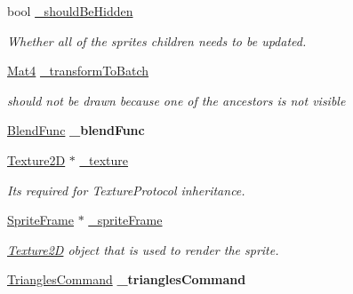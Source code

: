 \begin{DoxyCompactItemize}
bool \hyperlink{classSprite_a0824643df9102b3d72aeffff1d94e8bf}{\+\_\+should\+Be\+Hidden}
\begin{DoxyCompactList}\small\item\em Whether all of the sprite\textquotesingle{}s children needs to be updated. \end{DoxyCompactList}\item 
\mbox{\label{classSprite_aeb5014ea5deb4ec208896a769b4a7b1f}} 
\hyperlink{classMat4}{Mat4} \hyperlink{classSprite_aeb5014ea5deb4ec208896a769b4a7b1f}{\+\_\+transform\+To\+Batch}
\begin{DoxyCompactList}\small\item\em should not be drawn because one of the ancestors is not visible \end{DoxyCompactList}\item 
\mbox{\label{classSprite_aaa257dfceda4e9cf3e124829bb1087be}} 
\hyperlink{structBlendFunc}{Blend\+Func} {\bfseries \+\_\+blend\+Func}
\item 
\mbox{\label{classSprite_a8b0baed963684908bb157dde6d8d2097}} 
\hyperlink{classTexture2D}{Texture2D} $\ast$ \hyperlink{classSprite_a8b0baed963684908bb157dde6d8d2097}{\+\_\+texture}
\begin{DoxyCompactList}\small\item\em It\textquotesingle{}s required for Texture\+Protocol inheritance. \end{DoxyCompactList}\item 
\mbox{\label{classSprite_ac6c32c8ac385e82e6a999fdb9aadad2a}} 
\hyperlink{classSpriteFrame}{Sprite\+Frame} $\ast$ \hyperlink{classSprite_ac6c32c8ac385e82e6a999fdb9aadad2a}{\+\_\+sprite\+Frame}
\begin{DoxyCompactList}\small\item\em \hyperlink{classTexture2D}{Texture2D} object that is used to render the sprite. \end{DoxyCompactList}\item 
\mbox{\label{classSprite_a9c190b6098d77e47ec3a18536a181339}} 
\hyperlink{classTrianglesCommand}{Triangles\+Command} {\bfseries \+\_\+triangles\+Command}
\item 
\mbox{\label{classSprite_a7341fed62a5472c73d71cb1fce49f206}} 

\end{DoxyCompactItemize}
